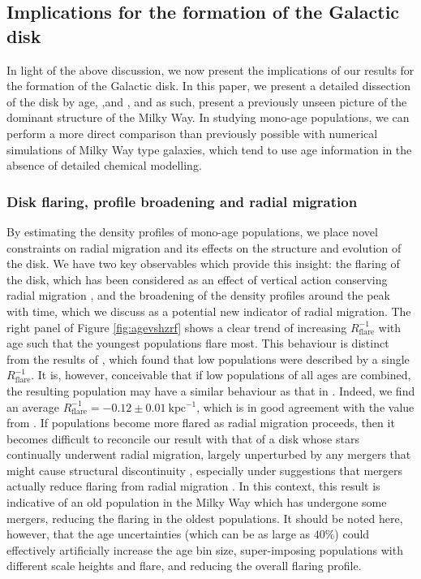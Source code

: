 \subsection{Implications for the formation of the Galactic disk}
\label{sec:implications}

In light of the above discussion, we now present the implications of our results for the formation of the Galactic disk. In this paper, we present a detailed dissection of the disk by age, \feh{},and \afe{}, and as such, present a previously unseen picture of the dominant structure of the Milky Way. In studying mono-age populations, we can perform a more direct comparison than previously possible with numerical simulations of Milky Way type galaxies, which tend to use age information in the absence of detailed chemical modelling.

\subsubsection{Disk flaring, profile broadening and radial migration}

By estimating the density profiles of mono-age populations, we place novel constraints on radial migration and its effects on the structure and evolution of the disk. We have two key observables which provide this insight: the flaring of the disk, which has been considered as an effect of vertical action conserving radial migration \citep[where stars have greater vertical excursions as they migrate outward, e.g.][]{2012A&A...548A.127M}, and the broadening of the density profiles around the peak with time, which we discuss as a potential new indicator of radial migration. The right panel of Figure \ref{fig:agevshzrf} shows a clear trend of increasing $R_{\mathrm{flare}}^{-1}$ with age such that the youngest populations flare most. This behaviour is distinct from the results of \citet{2016ApJ...823...30B}, which found that low \afe{} populations were described by a single $R_{\mathrm{flare}}^{-1}$. It is, however, conceivable that if low \afe{} populations of all ages are combined, the resulting population may have a similar behaviour as that in \citet{2016ApJ...823...30B}. Indeed, we find  an average $R_{\mathrm{flare}}^{-1} = -0.12\pm 0.01\ \mathrm{kpc^{-1}}$, which is in good agreement with the value from \citet{2016ApJ...823...30B}. If populations become more flared as radial migration proceeds, then it becomes difficult to reconcile our result with that of a disk whose stars continually underwent radial migration, largely unperturbed by any mergers that might cause structural discontinuity \citep[e.g.][]{2014MNRAS.442.2474M}, especially under suggestions that mergers actually reduce flaring from radial migration \citep[e.g.][]{2014A&A...572A..92M}. In this context, this result is indicative of an old population in the Milky Way which has undergone some mergers, reducing the flaring in the oldest populations. It should be noted here, however, that the age uncertainties (which can be as large as $40\%$) could effectively artificially increase the age bin size, super-imposing populations with different scale heights and flare, and reducing the overall flaring profile.

